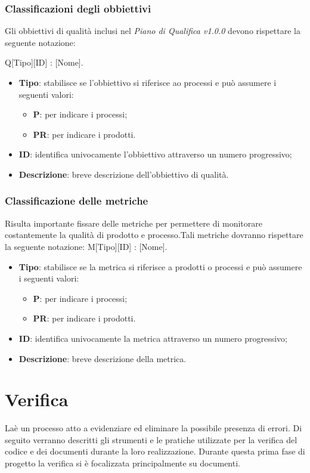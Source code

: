 \subsubsection{Classificazioni degli obbiettivi} 
Gli obbiettivi di qualità inclusi nel \textit{Piano di Qualifica v1.0.0} devono rispettare la seguente notazione: \\
\begin{center}
Q[Tipo][ID] : [Nome].
\end{center}
\begin{itemize}
	\item \textbf{Tipo}: stabilisce se l'obbiettivo si riferisce ao processi e può assumere i seguenti valori:
	\begin{itemize}
		\item \textbf{P}: per indicare i processi;
		\item \textbf{PR}: per indicare i prodotti.
	\end{itemize}
	\item \textbf{ID}: identifica univocamente l'obbiettivo attraverso un numero progressivo;
	\item \textbf{Descrizione}: breve descrizione dell'obbiettivo di qualità.
\end{itemize}
\subsubsection{Classificazione delle metriche}
Risulta importante fissare delle metriche per permettere di monitorare costantemente la qualità di prodotto e processo.Tali metriche dovranno rispettare la seguente notazione:
M[Tipo][ID] : [Nome].\\
\begin{itemize}
	\item \textbf{Tipo}: stabilisce se la metrica si riferisce a prodotti o processi e può assumere i seguenti valori:
	\begin{itemize}
		\item \textbf{P}: per indicare i processi;
		\item \textbf{PR}: per indicare i prodotti.
	\end{itemize}
	\item \textbf{ID}: identifica univocamente la metrica attraverso un numero progressivo;
	\item \textbf{Descrizione}: breve descrizione della metrica.
\end{itemize}

\section{Verifica}
Laè un processo atto a evidenziare ed eliminare la possibile presenza di errori.
Di seguito verranno descritti gli strumenti e le pratiche utilizzate per la verifica del codice e dei documenti durante la loro realizzazione.
Durante questa prima fase di progetto la verifica si è focalizzata principalmente su documenti.
